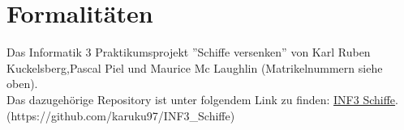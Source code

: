 \section{Formalitäten}

Das Informatik 3 Praktikumsprojekt ''Schiffe versenken'' von Karl Ruben Kuckelsberg,\newline Pascal Piel und Maurice Mc Laughlin (Matrikelnummern siehe oben).\\
Das dazugehörige Repository ist unter folgendem Link zu finden: \href{https://github.com/karuku97/INF3_Schiffe}{INF3 Schiffe}.\\
(https://github.com/karuku97/INF3\_Schiffe)

